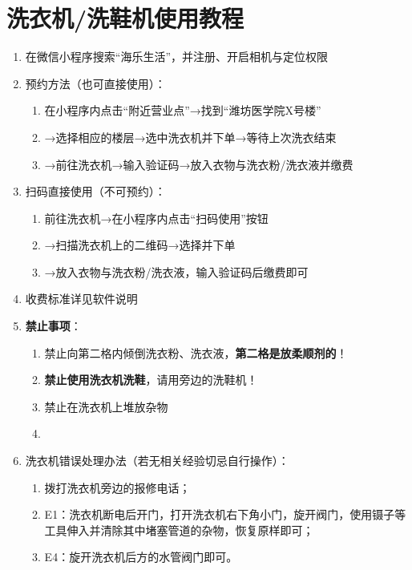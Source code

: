 \section[洗衣机/洗鞋机使用教程]{洗衣机/洗鞋机使用教程}
\label{washing_machine}
\begin{enumerate}
      \item 在微信小程序搜索“海乐生活”，并注册、开启相机与定位权限
      \item 预约方法（也可直接使用）：
            \begin{enumerate}
                  \item 在小程序内点击“附近营业点”→找到“潍坊医学院X号楼”
                  \item →选择相应的楼层→选中洗衣机并下单→等待上次洗衣结束
                  \item →前往洗衣机→输入验证码→放入衣物与洗衣粉/洗衣液并缴费
            \end{enumerate}
      \item 扫码直接使用（不可预约）：
            \begin{enumerate}
                  \item 前往洗衣机→在小程序内点击“扫码使用”按钮
                  \item →扫描洗衣机上的二维码→选择并下单
                  \item →放入衣物与洗衣粉/洗衣液，输入验证码后缴费即可
            \end{enumerate}
      \item 收费标准详见软件说明
      \item \textbf{禁止事项}：
            \begin{enumerate}
                  \item 禁止向第二格内倾倒洗衣粉、洗衣液，\textbf{第二格是放柔顺剂的}！
                  \item \textbf{禁止使用洗衣机洗鞋}，请用旁边的洗鞋机！
                  \item 禁止在洗衣机上堆放杂物
                  \item \textbf{}
            \end{enumerate}
      \item 洗衣机错误处理办法（若无相关经验切忌自行操作）：
            \begin{enumerate}
                  \item 拨打洗衣机旁边的报修电话；
                  \item E1：洗衣机断电后开门，打开洗衣机右下角小门，旋开阀门，使用镊子等工具伸入并清除其中堵塞管道的杂物，恢复原样即可；
                  \item E4：旋开洗衣机后方的水管阀门即可。
            \end{enumerate}
\end{enumerate}

